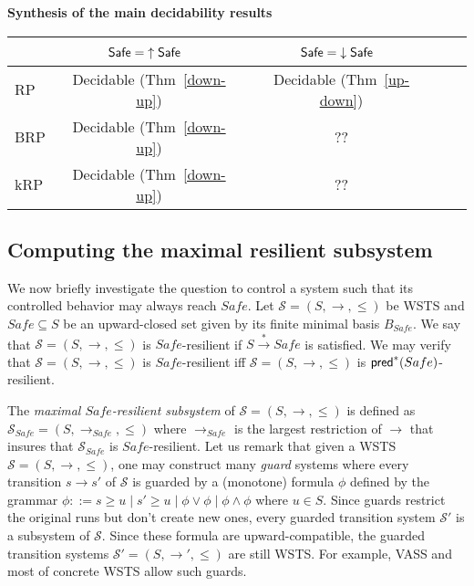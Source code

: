   
  





{\bf Synthesis of the main decidability results}\label{synthesis}
\begin{center}
\begin{tabular}{ | l | c | c | c | r |}
\hline   \ %
		& $\textsf{Safe} = {\uparrow \textsf{Safe}}$~ 
		 & $\textsf{Safe} = {\downarrow \textsf{Safe}}$~ 
 \\ \hline
   RP %
   	& Decidable (Thm~\ref{down-up})  
   		 & Decidable (Thm~\ref{up-down}) 
    \\ \hline
   BRP %
   &  Decidable (Thm~\ref{down-up}) 
   		 & ?? 
    \\ \hline
      kRP %
      & Decidable (Thm~\ref{down-up}) 
      		& ?? 
       \\ \hline
 \end{tabular}
\end{center}


\subsection{Computing the maximal resilient subsystem}

We now briefly investigate the question to control a system such that its controlled behavior may always reach $Safe$.
%
Let $\mathscr{S}=(S, \rightarrow, \leq)$ be WSTS and $Safe \subseteq S$ be an upward-closed set given by its finite minimal basis $B_{Safe}$. 
%
We say that $\mathscr{S}=(S, \rightarrow, \leq)$ is $Safe$-resilient if $S  \xrightarrow{*} Safe$ is satisfied.  
%
We may verify that  $\mathscr{S}=(S, \rightarrow, \leq)$ is $Safe$-resilient iff  $\mathscr{S}=(S, \rightarrow, \leq)$ is $\textsf{pred}^*(Safe)$-resilient. 

The \emph{maximal $Safe$-resilient subsystem} of $\mathscr{S}=(S,\rightarrow,\leq)$ is defined as $\mathscr{S}_{Safe}=(S,\rightarrow_{Safe},\leq)$ where $\rightarrow_{Safe}$ is the largest restriction of $\rightarrow$ that insures that $\mathscr{S}_{Safe}$ is $Safe$-resilient.
Let us remark that given a WSTS $\mathscr{S}=(S, \rightarrow, \leq)$, one may construct many \emph{guard} systems where every transition $s \rightarrow s'$ of $\mathscr{S}$ is guarded by a (monotone) formula $\phi$ defined by the grammar $\phi ::= s \geq u \mid s' \geq u \mid \phi \vee \phi \mid \phi \wedge \phi$ where $u \in S$. Since guards restrict the original runs but don't create new ones, every guarded transition system $\mathscr{S'}$ is a subsystem of $\mathscr{S}$. Since these formula are upward-compatible, the guarded transition systems $\mathscr{S'}=(S, \rightarrow', \leq)$ are still WSTS.
%
For example, VASS and most of concrete WSTS allow such guards.

